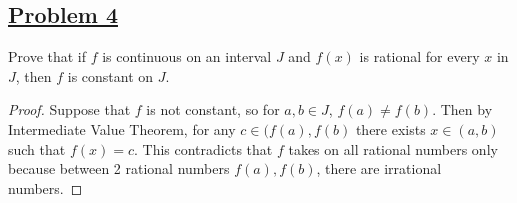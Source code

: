 \documentclass[10pt,letterpaper]{article}
\begin{document}
	\subsection*{{\color{purple}\underline{Problem 4}}}
	Prove that if $f$ is continuous on an interval $J$ and $f(x)$ is rational for every $x$ in $J$,
	then $f$ is constant on $J$.
	\begin{proof}
		Suppose that $f$ is not constant, so for $a, b \in J$, $f(a) \neq f(b)$. Then by Intermediate Value
		Theorem, for any $c \in (f(a), f(b)$ there exists $x \in (a, b)$ such that $f(x) = c$. This contradicts
		that $f$ takes on all rational numbers only because between 2 rational numbers $f(a), f(b)$, there are
		irrational numbers. 	
	\end{proof}
	
	
\end{document}
